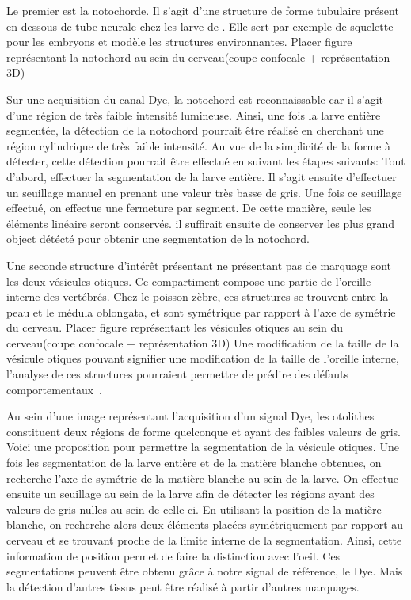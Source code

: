 \documentclass[\main/main.tex]{subfiles}
\begin{document}
%
Le premier est la notochorde.
%
Il s'agit d'une structure de forme tubulaire présent en dessous de tube neurale chez les larve de \pz{}.
%
Elle sert par exemple de squelette pour les embryons et modèle les structures environnantes.
\color{magenta}
Placer figure représentant la notochord au sein du cerveau(coupe confocale + représentation 3D)
\color{black}

%
Sur une acquisition du canal Dye, la notochord est reconnaissable car il s'agit d'une région de très faible intensité lumineuse.
%
Ainsi, une fois la larve entière segmentée,
la détection de la notochord pourrait être réalisé en cherchant une région cylindrique de très faible intensité.
%
Au vue de la simplicité de la forme à détecter, cette détection pourrait être effectué en suivant les étapes suivants:
%
Tout d'abord, effectuer la segmentation de la larve entière.
%
Il s'agit ensuite d'effectuer un seuillage manuel en prenant une valeur très basse de gris.
%
Une fois ce seuillage effectué, on effectue une fermeture par segment.
%
De cette manière, seule les éléments linéaire seront conservés.
%
il suffirait ensuite de conserver les plus grand object détécté pour obtenir une segmentation de la notochord.

%
Une seconde structure d'intérêt présentant ne présentant pas de marquage sont les deux vésicules otiques.
%
Ce compartiment compose une partie de l'oreille interne des vertébrés.
%
Chez le poisson-zèbre, ces structures se trouvent entre la peau et le médula oblongata,
et sont symétrique par rapport à l'axe de symétrie du cerveau.
\color{magenta}
Placer figure représentant les vésicules otiques au sein du cerveau(coupe confocale + représentation 3D)
\color{black}
%
Une modification de la taille de la vésicule otiques pouvant signifier une modification de la taille de l'oreille interne,
l'analyse de ces structures pourraient permettre de prédire des défauts comportementaux~\cite{Whitfield_1996}.

%
Au sein d'une image représentant l'acquisition d'un signal Dye,
les otolithes constituent deux régions de forme quelconque et ayant des faibles valeurs de gris.
%
Voici une proposition pour permettre la segmentation de la vésicule otiques.
%
Une fois les segmentation de la larve entière et de la matière blanche obtenues, on recherche l'axe de symétrie de la matière blanche au sein de la larve.
%
On effectue ensuite un seuillage au sein de la larve afin de détecter les régions ayant des valeurs de gris nulles au sein de celle-ci.
%
En utilisant la position de la matière blanche, on recherche alors deux éléments placées symétriquement par rapport au cerveau et se trouvant proche de la limite interne de la segmentation.
%
Ainsi, cette information de position permet de faire la distinction avec l'oeil.
%
Ces segmentations peuvent être obtenu grâce à notre signal de référence, le Dye.
%
Mais la détection d'autres tissus peut être réalisé à partir d'autres marquages.
\end{document}
